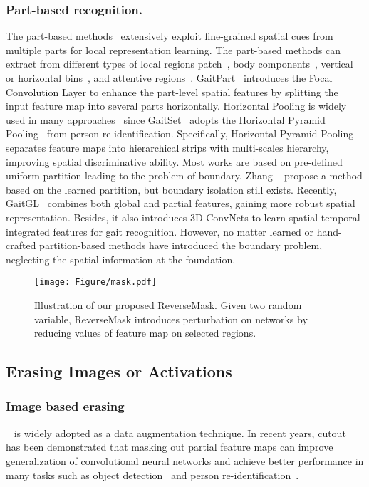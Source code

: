 \documentclass[runningheads]{llncs}
\begin{document}
    \subsubsection{Part-based recognition.} The part-based methods~\cite{gaitpart,gaitgl,2019_part_zhangyuqi} extensively exploit fine-grained spatial cues from multiple parts for local representation learning. The part-based methods can extract from different types of local regions \ie patch~\cite{patch}, body components~\cite{usflabel,ptsn}, vertical or horizontal bins~\cite{gaitmaskold}, and attentive regions~\cite{reid_attention_part}. GaitPart~\cite{gaitpart} introduces the Focal Convolution Layer to enhance the part-level spatial features by splitting the input feature map into several parts horizontally. Horizontal Pooling is widely used in many approaches~\cite{gln,cstl,gaitgl} since GaitSet~\cite{aaai2019gaitset} adopts the Horizontal Pyramid Pooling~\cite{HPP} from person re-identification. Specifically, Horizontal Pyramid Pooling separates feature maps into hierarchical strips with multi-scales hierarchy, improving spatial discriminative ability. Most works\cite{gaitgl,gaitpart,2019_part_zhangyuqi} are based on pre-defined uniform partition leading to the problem of boundary. Zhang \etal~\cite{2019_part_zhangyuqi} propose a method based on the learned partition, but boundary isolation still exists. Recently, GaitGL~\cite{gaitgl} combines both global and partial features, gaining more robust spatial representation. Besides, it also introduces 3D ConvNets to learn spatial-temporal integrated features for gait recognition. However, no matter learned or hand-crafted partition-based methods have introduced the boundary problem, neglecting the spatial information at the foundation.
\begin{figure}[ht!]
\centering
\texttt{[image: Figure/mask.pdf]}
\centering
\caption{
Illustration of our proposed ReverseMask. Given two random variable, ReverseMask introduces perturbation on networks by reducing values of feature map on selected regions.}
\label{fig:reversmask}
\vspace{-5mm}
\end{figure}
\subsection{Erasing Images or Activations}

    \subsubsection{Image based erasing}~\cite{cutout,RandomErasing} is widely adopted as a data augmentation technique. In recent years, cutout~\cite{cutout} has been demonstrated that masking out partial feature maps can improve generalization of convolutional neural networks and achieve better performance in many tasks such as object detection~\cite{bochkovskiy2020yolov4} and person re-identification~\cite{RandomErasing}. 
  
\end{document}
